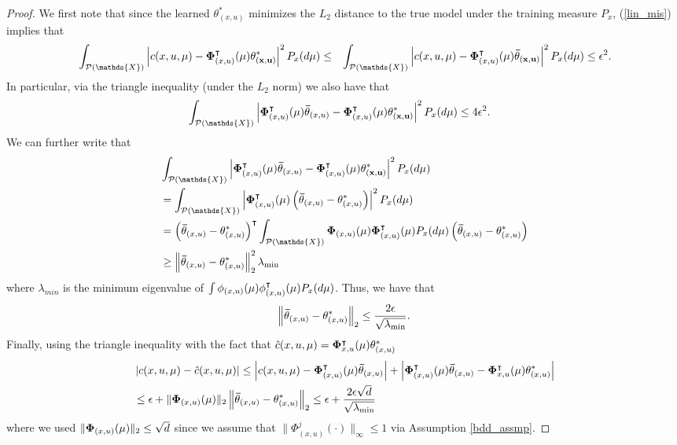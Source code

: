 \documentclass[twoside,11pt]{article}
\def\P{{\mathcal P}}
\begin{document}
\begin{proof}
We first note that since the learned $\theta^*_{(x,u)}$ minimizes the $L_2$ distance to the true model under the training measure $P_{x}$,
(\ref{lin_mis}) implies that 
\begin{align*}
& \int_{\P(\mathds{X})} \left| c(x,u,\mu) - {\bf \Phi}_{(x,u)}^\intercal(\mu) {\bf \theta^*_{(x,u)}}\right|^2 P_{x}(d\mu) \leq & \int_{\P(\mathds{X})} \left| c(x,u,\mu) - {\bf \Phi}_{(x,u)}^\intercal(\mu) {\bf \bar{\theta}_{(x,u)}}\right|^2 P_{x}(d\mu)\leq \epsilon^2.
\end{align*}
In particular, via the triangle inequality (under the $L_2$ norm) we also have that
\begin{align*}
 &\int_{\P(\mathds{X})} \left|  {\bf \Phi}_{(x,u)}^\intercal(\mu) {\bf \bar{\theta}}_{(x,u)} -  {\bf \Phi}_{(x,u)}^\intercal(\mu) {\bf \theta^*_{(x,u)}}\right|^2 P_{x}(d\mu) \leq 4 \epsilon^2.
\end{align*}
We can further write that 
\begin{align*}
 &\int_{\P(\mathds{X})} \left|  {\bf \Phi}_{(x,u)}^\intercal(\mu) {\bf \bar{\theta}}_{(x,u)} -  {\bf \Phi}_{(x,u)}^\intercal(\mu) {\bf \theta^*_{(x,u)}}\right|^2 P_{x}(d\mu) \\
 &= \int_{\P(\mathds{X})} \left|  {\bf \Phi}_{(x,u)}^\intercal(\mu) \left({\bf \bar{\theta}}_{(x,u)} - \theta^*_{(x,u)}\right) \right|^2 P_{x}(d\mu) \\
 &=  \left({\bf \bar{\theta}}_{(x,u)} - \theta^*_{(x,u)}\right)^\intercal  \int_{\P(\mathds{X})}   {\bf \Phi}_{(x,u)}(\mu) {\bf \Phi}^\intercal_{(x,u)}(\mu) P_{x}(d\mu)  \left({\bf \bar{\theta}}_{(x,u)} - \theta^*_{(x,u)}\right)\\
 &\geq \left\|{\bf \bar{\theta}}_{(x,u)} - \theta^*_{(x,u)}\right\|_2^2 \lambda_{\min}
\end{align*}
where $\lambda_{min}$ is the minimum eigenvalue of $\int {\bf \phi}_{(x,u)}(\mu){\bf \phi}_{(x,u)}^\intercal (\mu)P_x(d\mu)$. Thus, we have that 
\begin{align*}
\left\|{\bf \bar{\theta}}_{(x,u)} - \theta^*_{(x,u)}\right\|_2 \leq \frac{2\epsilon}{\sqrt{\lambda_{\min}}}.
\end{align*}
Finally, using the triangle inequality with the fact that $\hat{c}(x,u,\mu) = {\bf \Phi}^\intercal_{x,u}(\mu)\theta^*_{(x,u)} $
\begin{align*}
&\left| c(x,u,\mu) - \hat{c}(x,u,\mu)  \right| \leq \left| c(x,u,\mu) - {\bf \Phi}_{(x,u)}^\intercal(\mu) {\bf \bar{\theta}}_{(x,u)} \right| + \left| {\bf \Phi}_{(x,u)}^\intercal(\mu) {\bf \bar{\theta}}_{(x,u)} - {\bf \Phi}^\intercal_{x,u}(\mu)\theta^*_{(x,u)}  \right|\\
&\leq \epsilon +  \|{\bf \Phi}_{(x,u)}(\mu) \|_2 \left\|{\bf \bar{\theta}}_{(x,u)} - \theta^*_{(x,u)}\right\|_2 \leq \epsilon + \frac{2\epsilon\sqrt{d}}{\sqrt{\lambda_{\min}}}
\end{align*}
where we used $\|{\bf \Phi}_{(x,u)}(\mu) \|_2 \leq \sqrt{d}$ since we assume that $
\|\Phi^j_{(x,u)}(\cdot)\|_\infty\leq 1$ via Assumption \ref{bdd_assmp}.


\end{proof}
\end{document}
